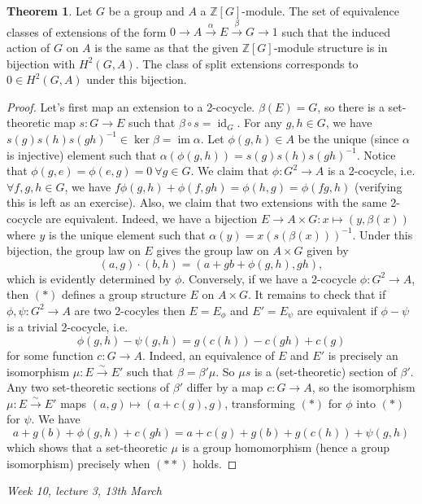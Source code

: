 \documentclass{article}
\newcommand{\Z}{\mathbb{Z}}
\newcommand{\id}{\operatorname{id}}
\newcommand{\im}{\operatorname{im}}
\theoremstyle{definition}
\newtheorem{thm}[defn]{Theorem}
\begin{document}
\begin{thm}
Let $G$ be a group and $A$ a $\Z[G]$-module. The set of equivalence classes of extensions of the form $0\rightarrow A\xrightarrow{\alpha} E\xrightarrow{\beta} G\rightarrow 1$ such that the induced action of $G$ on $A$ is the same as that the given $\Z[G]$-module structure is in bijection with $H^2(G,A)$. The class of split extensions corresponds to $0\in H^2(G,A)$ under this bijection.
\end{thm}
\begin{proof}
Let's first map an extension to a 2-cocycle. $\beta(E)=G$, so there is a set-theoretic map $s:G\rightarrow E$ such that $\beta\circ s=\id_G$. For any $g,h\in G$, we have $s(g)s(h)s(gh)^{-1}\in\ker\beta=\im\alpha$. Let $\phi(g,h)\in A$ be the unique (since $\alpha$ is injective) element such that $\alpha(\phi(g,h))=s(g)s(h)s(gh)^{-1}$. Notice that $\phi(g,e)=\phi(e,g)=0 \ \forall g\in G$. We claim that $\phi:G^2\rightarrow A$ is a 2-cocycle, i.e. $\forall f,g,h\in G$, we have $f\phi(g,h)+\phi(f,gh)=\phi(h,g)=\phi(fg,h)$ (verifying this is left as an exercise). Also, we claim that two extensions with the same 2-cocycle are equivalent. Indeed, we have a bijection $E\rightarrow A\times G:x\mapsto (y,\beta(x))$ where $y$ is the unique element such that $\alpha(y)=x(s(\beta(x)))^{-1}$. Under this bijection, the group law on $E$ gives the group law on $A\times G$ given by
\[
\tag{\ast}
(a,g)\cdot(b,h)=(a+gb+\phi(g,h),gh),
\]
which is evidently determined by $\phi$. Conversely, if we have a 2-cocycle $\phi:G^2\rightarrow A$, then $(\ast)$ defines a group structure $E$ on $A\times G$. It remains to check that if $\phi,\psi:G^2\rightarrow A$ are two 2-cocyles then $E=E_\phi$ and $E'=E_\psi$ are equivalent if $\phi-\psi$ is a trivial 2-cocycle, i.e.
\[
\tag{\ast\ast}
\phi(g,h)-\psi(g,h)=g(c(h))-c(gh)+c(g)
\]
for some function $c:G\rightarrow A$. Indeed, an equivalence of $E$ and $E'$ is precisely an isomorphism $\mu:E\xrightarrow{\sim}E'$ such that $\beta=\beta'\mu$. So $\mu s$ is a (set-theoretic) section of $\beta'$. Any two set-theoretic sections of $\beta'$ differ by a map $c:G\rightarrow A$, so the isomorphism $\mu:E\xrightarrow{\sim}E'$ maps $(a,g)\mapsto (a+c(g),g)$, transforming $(\ast)$ for $\phi$ into $(\ast)$ for $\psi$. We have
\[
a+g(b)+\phi(g,h)+c(gh)=a+c(g)+g(b)+g(c(h))+\psi(g,h)
\]
which shows that a set-theoretic $\mu$ is a group homomorphism (hence a group isomorphism) precisely when $(\ast\ast)$ holds.
\end{proof}

\begin{flushright}
\textit{Week 10, lecture 3, 13th March}
\end{flushright}
\end{document}
